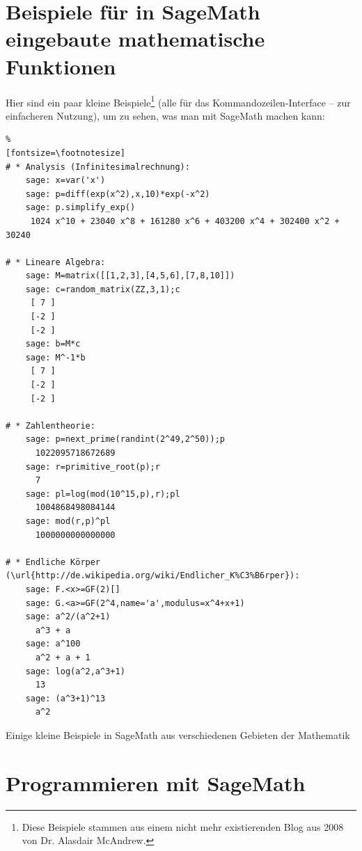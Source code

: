 \newpage
\section*{Beispiele für in SageMath eingebaute mathematische Funktionen}

Hier sind ein paar kleine Beispiele\footnote{%
Diese Beispiele stammen aus einem nicht mehr existierenden Blog aus 2008 von Dr. Alasdair McAndrew.
}
(alle für das Kommandozeilen-Interface -- zur einfacheren Nutzung), um zu sehen,
was man mit SageMath machen kann:

\begin{sagecode}
\begin{Verbatim}%
[fontsize=\footnotesize]
# * Analysis (Infinitesimalrechnung):
    sage: x=var('x')
    sage: p=diff(exp(x^2),x,10)*exp(-x^2)
    sage: p.simplify_exp()
     1024 x^10 + 23040 x^8 + 161280 x^6 + 403200 x^4 + 302400 x^2 + 30240

# * Lineare Algebra:
    sage: M=matrix([[1,2,3],[4,5,6],[7,8,10]])
    sage: c=random_matrix(ZZ,3,1);c
     [ 7 ]
     [-2 ]
     [-2 ]
    sage: b=M*c
    sage: M^-1*b
     [ 7 ]
     [-2 ]
     [-2 ]

# * Zahlentheorie:
    sage: p=next_prime(randint(2^49,2^50));p
      1022095718672689
    sage: r=primitive_root(p);r
      7
    sage: pl=log(mod(10^15,p),r);pl
      1004868498084144
    sage: mod(r,p)^pl
      1000000000000000

# * Endliche Körper (\url{http://de.wikipedia.org/wiki/Endlicher_K%C3%B6rper}):
    sage: F.<x>=GF(2)[]
    sage: G.<a>=GF(2^4,name='a',modulus=x^4+x+1)
    sage: a^2/(a^2+1)
      a^3 + a
    sage: a^100
      a^2 + a + 1
    sage: log(a^2,a^3+1)
      13
    sage: (a^3+1)^13
      a^2
\end{Verbatim}
\caption{Einige kleine Beispiele in SageMath aus verschiedenen Gebieten der Mathematik}
\end{sagecode}



\newpage
\section*{Programmieren mit SageMath}

